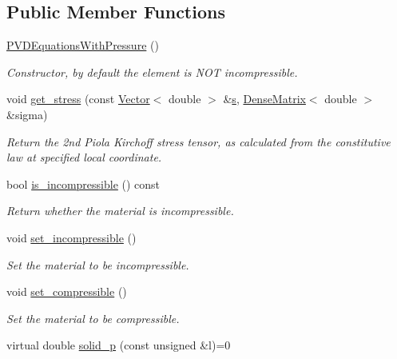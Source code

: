\subsection*{Public Member Functions}
\begin{DoxyCompactItemize}
\item 
\hyperlink{classoomph_1_1PVDEquationsWithPressure_af689308b2b9b9e0d54fa8f052d28935c}{P\+V\+D\+Equations\+With\+Pressure} ()
\begin{DoxyCompactList}\small\item\em Constructor, by default the element is N\+OT incompressible. \end{DoxyCompactList}\item 
void \hyperlink{classoomph_1_1PVDEquationsWithPressure_a15cfb4084a47c24f7cf108554a4b850d}{get\+\_\+stress} (const \hyperlink{classoomph_1_1Vector}{Vector}$<$ double $>$ \&\hyperlink{cfortran_8h_ab7123126e4885ef647dd9c6e3807a21c}{s}, \hyperlink{classoomph_1_1DenseMatrix}{Dense\+Matrix}$<$ double $>$ \&sigma)
\begin{DoxyCompactList}\small\item\em Return the 2nd Piola Kirchoff stress tensor, as calculated from the constitutive law at specified local coordinate. \end{DoxyCompactList}\item 
bool \hyperlink{classoomph_1_1PVDEquationsWithPressure_acdcef316bde216f8b70520248b83f40c}{is\+\_\+incompressible} () const
\begin{DoxyCompactList}\small\item\em Return whether the material is incompressible. \end{DoxyCompactList}\item 
void \hyperlink{classoomph_1_1PVDEquationsWithPressure_ad816b1c0bbe67f32a30b0152daef0756}{set\+\_\+incompressible} ()
\begin{DoxyCompactList}\small\item\em Set the material to be incompressible. \end{DoxyCompactList}\item 
void \hyperlink{classoomph_1_1PVDEquationsWithPressure_a21c262fef599637b72c6e2fd82a00fe5}{set\+\_\+compressible} ()
\begin{DoxyCompactList}\small\item\em Set the material to be compressible. \end{DoxyCompactList}\item 
virtual double \hyperlink{classoomph_1_1PVDEquationsWithPressure_a2f447e84104fbdd8afe9efe52c62f2b3}{solid\+\_\+p} (const unsigned \&l)=0

\end{DoxyCompactItemize}
